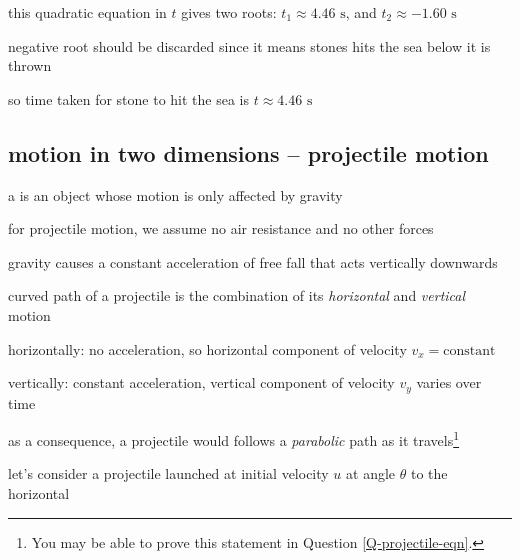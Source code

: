 this quadratic equation in $t$ gives two roots: $t_1 \approx 4.46 \text{ s}$, and $t_2 \approx -1.60 \text{ s}$

negative root should be discarded since it means stones hits the sea below it is thrown

so time taken for stone to hit the sea is $t \approx 4.46\text{ s}$ \eoe





\subsection{motion in two dimensions -- projectile motion}\label{ch:projectile}

a  is an object whose motion is only affected by gravity

for projectile motion, we assume no air resistance and no other forces

gravity causes a constant acceleration of free fall that acts vertically downwards

\cmt curved path of a projectile is the combination of its \emph{horizontal} and \emph{vertical} motion

\titem horizontally: no acceleration, so horizontal component of velocity $v_x = \text{constant}$

\titem vertically: constant acceleration, vertical component of velocity $v_y$ varies over time

as a consequence, a projectile would follows a \emph{parabolic} path as it travels\footnote{You may be able to prove this statement in Question \ref{Q-projectile-eqn}.}


\vspace*{\baselineskip}

let's consider a projectile launched at initial velocity $u$ at angle $\theta$ to the horizontal

